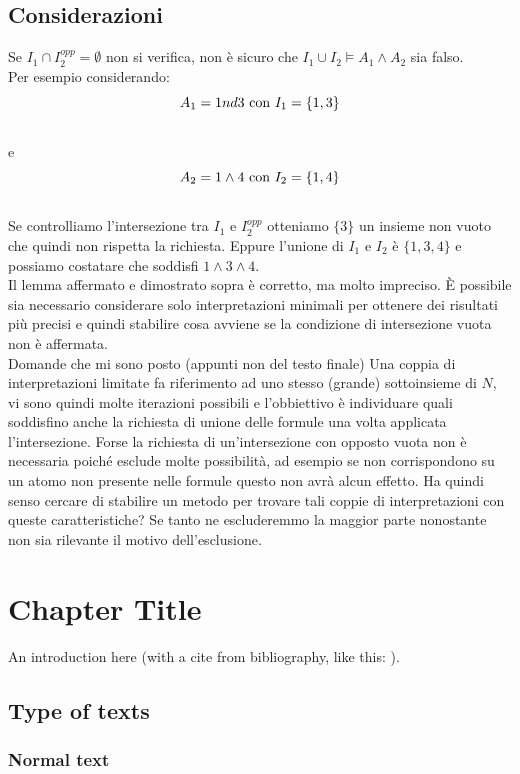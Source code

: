\section{Considerazioni}
    Se $I_1 \cap I_2^{opp} = \emptyset$ non si verifica, non è sicuro che $I_1 \cup I_2 \models A_1 \land A_2$ sia falso.\\
    Per esempio considerando:\\
    \[A_1 = 1 \label  and 3 \textnormal{ con } I_1 = \{1, 3\}\]\\
    e 
    \[A_2 = 1 \land 4 \textnormal{ con } I_2 = \{1, 4\}\]\\
    Se controlliamo l'intersezione tra $I_1$ e $I_2^{opp}$ otteniamo $\{3\}$ un insieme non vuoto che quindi non rispetta la richiesta.
    Eppure l'unione di $I_1$ e $I_2$ è $\{1, 3, 4\}$ e possiamo costatare che soddisfi $1 \land 3 \land 4$.\\
    Il lemma affermato e dimostrato sopra è corretto, ma molto impreciso.
    È possibile sia necessario considerare solo interpretazioni minimali per ottenere dei risultati più precisi e quindi stabilire cosa avviene se la condizione di intersezione vuota non è affermata.\\

    Domande che mi sono posto (appunti non del testo finale)
    Una coppia di interpretazioni limitate fa riferimento ad uno stesso (grande) sottoinsieme di $N$, vi sono quindi molte iterazioni possibili e l'obbiettivo è individuare quali soddisfino anche la richiesta di unione delle formule una volta applicata l'intersezione. Forse la richiesta di un'intersezione con opposto vuota non è necessaria poiché esclude molte possibilità, ad esempio se non corrispondono su un atomo non presente nelle formule questo non avrà alcun effetto. Ha quindi senso cercare di stabilire un metodo per trovare tali coppie di interpretazioni con queste caratteristiche? Se tanto ne escluderemmo la maggior parte nonostante non sia rilevante il motivo dell'esclusione.

\chapter{Chapter Title}

An introduction here (with a cite from bibliography, like this: \cite{greenwade93}).
\section{Type of texts}
\subsection{Normal text}
\lipsum[1]

